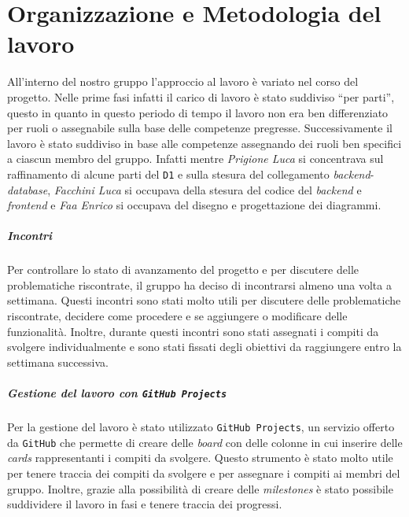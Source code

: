 \chapter{Organizzazione e Metodologia del lavoro}
All'interno del nostro gruppo l'approccio al lavoro è variato nel corso del progetto. Nelle prime fasi infatti il carico di lavoro è stato suddiviso ``per parti'', questo in quanto in questo periodo di tempo il lavoro non era ben differenziato per ruoli o assegnabile sulla base delle competenze pregresse. Successivamente il lavoro è stato suddiviso in base alle competenze assegnando dei ruoli ben specifici a ciascun membro del gruppo. Infatti mentre \textit{Prigione Luca} si concentrava sul raffinamento di alcune parti del \texttt{D1} e sulla stesura del collegamento \textit{backend}-\textit{database}, \textit{Facchini Luca} si occupava della stesura del codice del \textit{backend} e \textit{frontend} e \textit{Faa Enrico} si occupava del disegno e progettazione dei diagrammi.
\paragraph{Incontri}
    Per controllare lo stato di avanzamento del progetto e per discutere delle problematiche riscontrate, il gruppo ha deciso di incontrarsi almeno una volta a settimana. Questi incontri sono stati molto utili per discutere delle problematiche riscontrate, decidere come procedere e se aggiungere o modificare delle funzionalità. Inoltre, durante questi incontri sono stati assegnati i compiti da svolgere individualmente e sono stati fissati degli obiettivi da raggiungere entro la settimana successiva.
\paragraph{Gestione del lavoro con \texttt{GitHub Projects}}
    Per la gestione del lavoro è stato utilizzato \texttt{GitHub Projects}, un servizio offerto da \texttt{GitHub} che permette di creare delle \textit{board} con delle colonne in cui inserire delle \textit{cards} rappresentanti i compiti da svolgere. Questo strumento è stato molto utile per tenere traccia dei compiti da svolgere e per assegnare i compiti ai membri del gruppo. Inoltre, grazie alla possibilità di creare delle \textit{milestones} è stato possibile suddividere il lavoro in fasi e tenere traccia dei progressi.